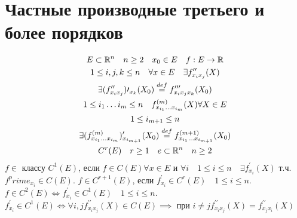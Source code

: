 \documentclass[main]{subfiles}
\begin{document}
\section{Частные производные третьего и более порядков}
\begin{gather*}
    E \subset \mathbb{R}^n \quad n \geq 2 \quad x_0 \in E \quad f: E \rightarrow \mathbb{R} \\
    1 \leq i,j,k \leq n \quad \forall x \in E \quad \exists f^{\prime\prime}_{x_ix_j}(X) \\
    \exists (f^{\prime\prime}_{x_ix_j})\prime_{x_k}(X_0) \stackrel{def}{=} f^{\prime\prime\prime}_{x_ix_jx_k}(X_0) \\
    1 \leq i_1 \ldots i_m \leq n \quad f^{(m)}_{x_{i_1}\ldots x_{i_m}}(X) \forall X \in E \\
    1 \leq i_{m+1} \leq n \\
    \exists (f^{(m)}_{x_{i_1} \ldots x_{i_m}})^{\prime}_{x_{i_{m+1}}}(X_0) \stackrel{def}{=} f^{(m+1)}_{x_{i_1} \ldots x_{i_{m+1}}}(X_0) \\
    C^r(E) \quad r \geq 1 \quad e \subset \mathbb{R}^n \quad n \geq 2 
\end{gather*}
    $f \in$ классу $C^1(E)$, если $f \in C(E) \forall x \in E$ и $\forall i \quad 1 \leq i \leq n \quad
    \exists f^{\prime}_{x_i}(X)$ т.ч. $f^prime_{x_i} \in C(E)$. $f \in C^{r+1}(E)$, если $f^\prime_{x_i} \in C^r(E) \quad 1 \leq i \leq n$.
    $f \in C^2(E) \Leftrightarrow f^\prime_{x_i} \in C^1(E) \quad 1 \leq i \leq n$. $f^\prime_{x_i} \in C^1(E) \Leftrightarrow
    \forall i, j f^{\prime\prime}_{x_i x_j}(X) \in C(E) \implies$ при $i \ne j f^{\prime\prime}_{x_ix_j}(X) = f^{\prime\prime}_{x_jx_i}(X)$
\end{document}
